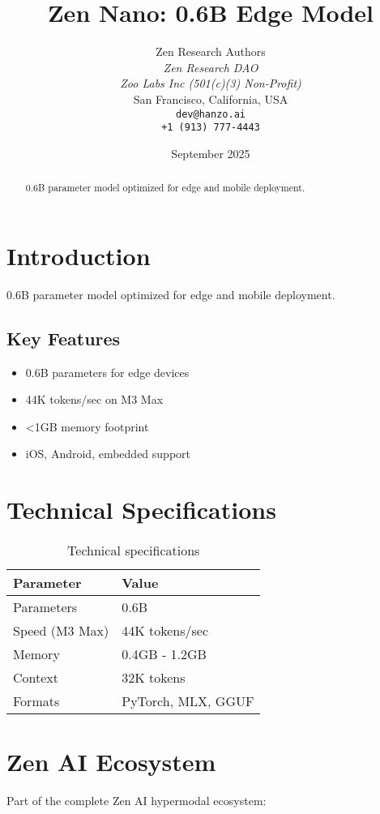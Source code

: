 \documentclass[11pt,a4paper]{article}
\title{Zen Nano: 0.6B Edge Model}
\author{
    Zen Research Authors \\
    \textit{Zen Research DAO} \\
    \textit{Zoo Labs Inc (501(c)(3) Non-Profit)} \\
    San Francisco, California, USA \\
    \texttt{dev@hanzo.ai} \\
    \texttt{+1 (913) 777-4443}
}
\date{September 2025}
\begin{document}
\maketitle

\begin{abstract}
0.6B parameter model optimized for edge and mobile deployment.
\end{abstract}

\section{Introduction}
0.6B parameter model optimized for edge and mobile deployment.

\subsection{Key Features}
\begin{itemize}
    \item 0.6B parameters for edge devices
    \item 44K tokens/sec on M3 Max
    \item <1GB memory footprint
    \item iOS, Android, embedded support
\end{itemize}

\section{Technical Specifications}
\begin{table}[h]
\centering
\begin{tabular}{@{}ll@{}}
\toprule
\textbf{Parameter} & \textbf{Value} \\
\midrule
Parameters & 0.6B \\
Speed (M3 Max) & 44K tokens/sec \\
Memory & 0.4GB - 1.2GB \\
Context & 32K tokens \\
Formats & PyTorch, MLX, GGUF
\bottomrule
\end{tabular}
\caption{Technical specifications}
\label{tab:specs}
\end{table}

\section{Zen AI Ecosystem}

Part of the complete Zen AI hypermodal ecosystem:
\end{document}
